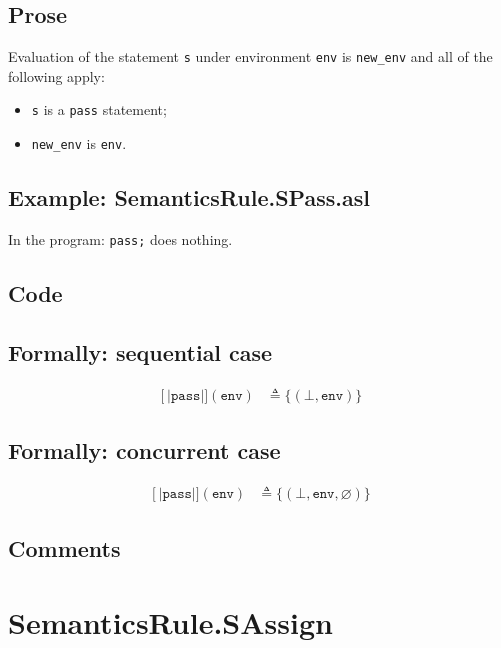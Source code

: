 \documentclass{book}
\newcommand\syntt[1]{\mathtt{#1}}
\newcommand\llbracket{[|}
\newcommand\rrbracket{|]}
\newcommand\interp[1]{\left\llbracket #1 \right\rrbracket}
\begin{document}
  \subsection{Prose}
  Evaluation of the statement \texttt{s} under environment \texttt{env} is
\texttt{new\_env} and all of the following apply:
  \begin{itemize}
  \item \texttt{s} is a \texttt{pass} statement;
  \item \texttt{new\_env} is \texttt{env}.
  \end{itemize}

  \subsection{Example: SemanticsRule.SPass.asl}
  In the program:
  \texttt{pass;} does nothing.

  \subsection{Code}

  \subsection{Formally: sequential case}
  \begin{align}
  \interp{\syntt{pass}} (\texttt{env}) & \triangleq \{ (\bot, \texttt{env}) \}
  \label{eq:sem-seq-spass}
  \end{align} 

  \subsection{Formally: concurrent case}
  \begin{align}
  \interp{\syntt{pass}} (\texttt{env}) & \triangleq \{ (\bot, \texttt{env}, \varnothing) \}
  \label{eq:sem-conc-spass}
  \end{align} 

  \subsection{Comments}

\section{SemanticsRule.SAssign \label{sec:SemanticsRule.SAssign}}
\end{document}
